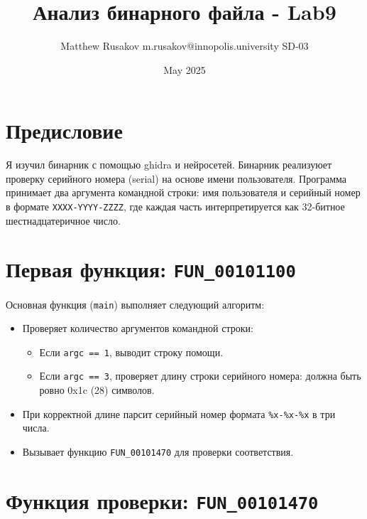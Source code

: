 \usepackage{amsmath}
\usepackage{listings}
\usepackage{color}
\usepackage{geometry}
\usepackage{hyperref}
\usepackage[utf8]{inputenc}
\usepackage[T1]{fontenc}
\usepackage[russian]{babel}

\title{Анализ бинарного файла - Lab9}
\author{Matthew Rusakov m.rusakov@innopolis.university SD-03}
\date{May 2025}




    \maketitle

    \section*{Предисловие}
    Я изучил бинарник с помощью ghidra и нейросетей.
    Бинарник реализуюет проверку серийного номера (serial) на основе имени пользователя.
    Программа принимает два аргумента командной строки: имя пользователя и серийный номер в формате \texttt{XXXX-YYYY-ZZZZ}, где каждая часть интерпретируется как 32-битное шестнадцатеричное число.


    \section{Первая функция: \texttt{FUN\_00101100}}

    Основная функция (\texttt{main}) выполняет следующий алгоритм:

    \begin{itemize}
        \item Проверяет количество аргументов командной строки:
        \begin{itemize}
            \item Если \texttt{argc == 1}, выводит строку помощи.
            \item Если \texttt{argc == 3}, проверяет длину строки серийного номера: должна быть ровно 0x1c (28) символов.
        \end{itemize}
        \item При корректной длине парсит серийный номер формата \texttt{\%x-\%x-\%x} в три числа.
        \item Вызывает функцию \texttt{FUN\_00101470} для проверки соответствия.
    \end{itemize}


    \section{Функция проверки: \texttt{FUN\_00101470}}


